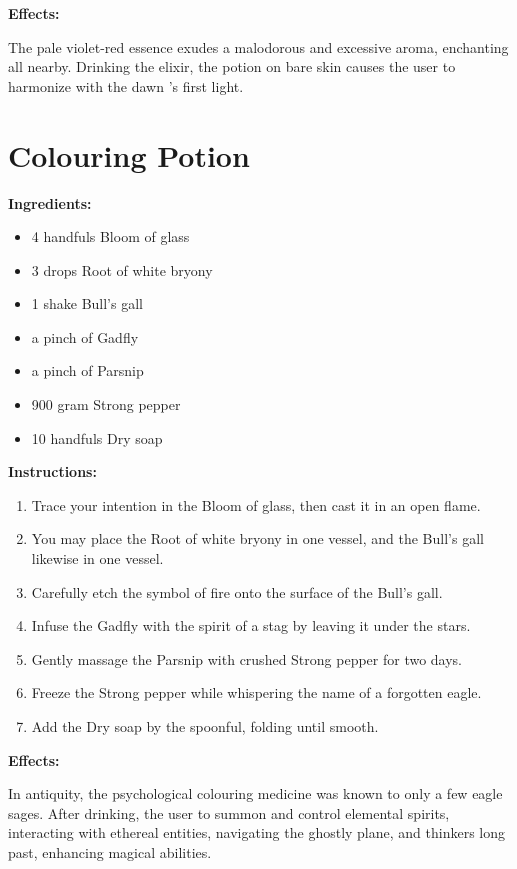 \documentclass{article}
\begin{document}
\textbf{Effects:}

The pale violet-red essence exudes a malodorous and excessive aroma, enchanting all nearby. Drinking the elixir, the potion on bare skin causes the user to harmonize with the dawn 's first light.

\newpage
\section*{Colouring Potion}

\textbf{Ingredients:}

\begin{itemize}
  \item 4 handfuls Bloom of glass
  \item 3 drops Root of white bryony
  \item 1 shake Bull's gall
  \item a pinch of Gadfly
  \item a pinch of Parsnip
  \item 900 gram Strong pepper
  \item 10 handfuls Dry  soap
\end{itemize}

\textbf{Instructions:}

\begin{enumerate}
  \item Trace your intention in the Bloom of glass, then cast it in an open flame.
  \item You may place the Root of white bryony in one vessel, and the Bull's gall likewise in one vessel.
  \item Carefully etch the symbol of fire onto the surface of the Bull's gall.
  \item Infuse the Gadfly with the spirit of a stag by leaving it under the stars.
  \item Gently massage the Parsnip with crushed Strong pepper for two days.
  \item Freeze the Strong pepper while whispering the name of a forgotten eagle.
  \item Add the Dry  soap by the spoonful, folding until smooth.
\end{enumerate}

\textbf{Effects:}

In antiquity, the psychological colouring medicine was known to only a few eagle sages. After drinking, the user to summon and control elemental spirits, interacting with ethereal entities, navigating the ghostly plane, and thinkers long past, enhancing magical abilities.
\end{document}
